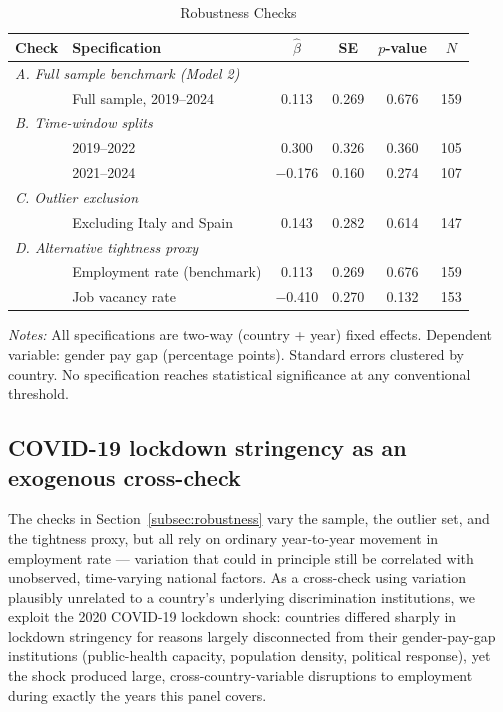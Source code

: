 \documentclass[12pt,a4paper]{article}
\begin{document}
\begin{table}[htbp]
\caption{Robustness Checks}
\label{tab:robustness}
\begin{threeparttable}
\begin{tabular}{llcccc}
\toprule
Check & Specification & $\hat{\beta}$ & SE & $p$-value & $N$ \\
\midrule
\multicolumn{6}{l}{\textit{A. Full sample benchmark (Model 2)}} \\[2pt]
 & Full sample, 2019--2024 & 0.113 & 0.269 & 0.676 & 159 \\[6pt]
\multicolumn{6}{l}{\textit{B. Time-window splits}} \\[2pt]
 & 2019--2022 & 0.300 & 0.326 & 0.360 & 105 \\
 & 2021--2024 & $-$0.176 & 0.160 & 0.274 & 107 \\[6pt]
\multicolumn{6}{l}{\textit{C. Outlier exclusion}} \\[2pt]
 & Excluding Italy and Spain & 0.143 & 0.282 & 0.614 & 147 \\[6pt]
\multicolumn{6}{l}{\textit{D. Alternative tightness proxy}} \\[2pt]
 & Employment rate (benchmark) & 0.113 & 0.269 & 0.676 & 159 \\
 & Job vacancy rate            & $-$0.410 & 0.270 & 0.132 & 153 \\
\bottomrule
\end{tabular}
\begin{tablenotes}
\footnotesize
\item \textit{Notes:} All specifications are two-way (country + year) fixed
  effects.  Dependent variable: gender pay gap (percentage points).  Standard
  errors clustered by country.  No specification reaches statistical
  significance at any conventional threshold.
\end{tablenotes}
\end{threeparttable}
\end{table}

\subsection{COVID-19 lockdown stringency as an exogenous cross-check}
\label{subsec:covid_event}

The checks in Section~\ref{subsec:robustness} vary the sample, the outlier
set, and the tightness proxy, but all rely on ordinary year-to-year movement
in employment rate --- variation that could in principle still be correlated
with unobserved, time-varying national factors.  As a cross-check using
variation plausibly unrelated to a country's underlying discrimination
institutions, we exploit the 2020 COVID-19 lockdown shock: countries differed
sharply in lockdown stringency for reasons largely disconnected from their
gender-pay-gap institutions (public-health capacity, population density,
political response), yet the shock produced large, cross-country-variable
disruptions to employment during exactly the years this panel covers.
\end{document}
